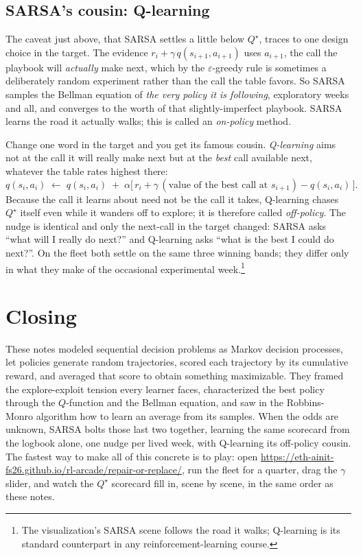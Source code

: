 \documentclass[11pt,a4paper]{article}
\theoremstyle{definition}
\theoremstyle{remark}
\numberwithin{equation}{section}
\newcommand{\vizurl}{\url{https://eth-ainit-fs26.github.io/rl-arcade/repair-or-replace/}}
\begin{document}
\subsection*{SARSA's cousin: Q-learning}

The caveat just above, that SARSA settles a little below $Q^\star$, traces to one design choice
in the target. The evidence $r_i + \gamma\, q(s_{i+1}, a_{i+1})$ uses $a_{i+1}$, the call the
playbook will \emph{actually} make next, which by the $\varepsilon$-greedy rule is sometimes a
deliberately random experiment rather than the call the table favors. So SARSA samples the
Bellman equation of \emph{the very policy it is following}, exploratory weeks and all, and
converges to the worth of that slightly-imperfect playbook. SARSA learns the road it actually
walks; this is called an \emph{on-policy} method.

Change one word in the target and you get its famous cousin. \emph{Q-learning} aims not at the
call it will really make next but at the \emph{best} call available next, whatever the table
rates highest there:
\[
q(s_i, a_i) \;\leftarrow\; q(s_i, a_i)
\;+\; \alpha \bigl[\, r_i + \gamma\,(\text{value of the best call at } s_{i+1}) - q(s_i, a_i) \,\bigr].
\]
Because the call it learns about need not be the call it takes, Q-learning chases $Q^\star$
itself even while it wanders off to explore; it is therefore called \emph{off-policy}. The
nudge is identical and only the next-call in the target changed: SARSA asks ``what will I
really do next?'' and Q-learning asks ``what is the best I could do next?''. On the fleet both
settle on the same three winning bands; they differ only in what they make of the occasional
experimental week.\footnote{The visualization's SARSA scene follows the road it walks;
Q-learning is its standard counterpart in any reinforcement-learning course.}

\section*{Closing}

These notes modeled sequential decision problems as Markov decision processes, let policies
generate random trajectories, scored each trajectory by its cumulative reward, and averaged
that score to obtain something maximizable. They framed the explore-exploit tension every
learner faces, characterized the best policy through the $Q$-function and the Bellman equation,
and saw in the Robbins-Monro algorithm how to learn an average from its samples. When the odds
are unknown, SARSA bolts those last two together, learning the same scorecard from the logbook
alone, one nudge per lived week, with Q-learning its off-policy cousin. The fastest way to make
all of this concrete is to play: open \vizurl, run the fleet for a quarter, drag the $\gamma$
slider, and watch the $Q^\star$ scorecard fill in, scene by scene, in the same order as these
notes.
\end{document}
